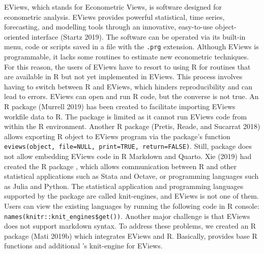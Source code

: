 EViews, which stands for Econometric Views, is software designed for econometric analysis. EViews provides powerful statistical, time series, forecasting, and modelling tools through an innovative, easy-to-use object-oriented interface (Startz 2019). The software can be operated via its built-in menu, code or scripts saved in a file with the \texttt{.prg} extension. Although EViews is programmable, it lacks some routines to estimate new econometric techniques. For this reason, the users of EViews have to resort to using R for routines that are available in R but not yet implemented in EViews. This process involves having to switch between R and EViews, which hinders reproducibility and can lead to errors. EViews can open and run R code, but the converse is not true. An R package  (Murrell 2019) has been created to facilitate importing EViews workfile data to R. The package is limited as it cannot run EViews code from within the R environment. Another R package  (Pretis, Reade, and Sucarrat 2018) allows exporting R object to EViews program via the package's function \texttt{eviews(object,\ file=NULL,\ print=TRUE,\ return=FALSE)}. Still,  package does not allow embedding EViews code in R Markdown and Quarto. Xie (2019) had created the R package , which allows communication between R and other statistical applications such as Stata and Octave, or programming languages such as Julia and Python. The statistical application and programming languages supported by the  package are called knit-engines, and EViews is not one of them. Users can view the existing  languages by running the following code in R console: \texttt{names(knitr::knit\_engines\$get())}. Another major challenge is that EViews does not support markdown syntax. To address these problems, we created an R package  (Mati 2019b) which integrates EViews and R. Basically,  provides base R functions and additional 's knit-engine for EViews.

